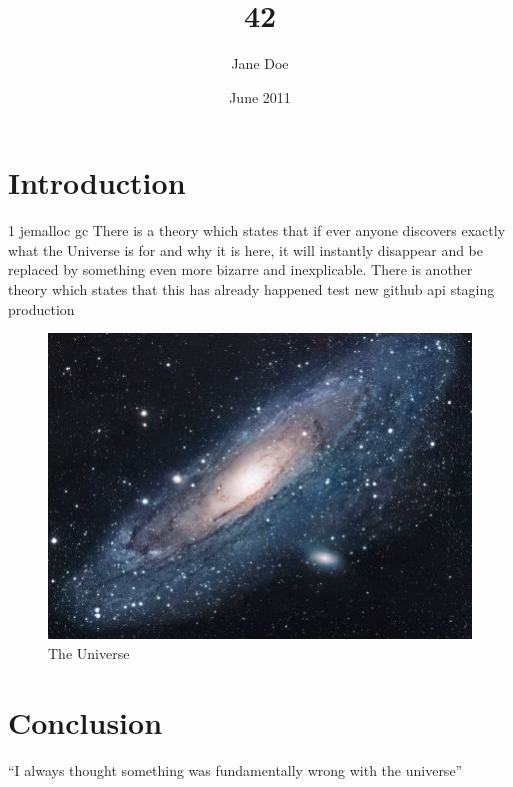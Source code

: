 \documentclass{article}
\title{42}
\author{Jane Doe}
\date{June 2011}
\begin{document}
\maketitle

\section{Introduction}
1
jemalloc gc
There is a theory which states that if ever anyone discovers exactly what
 the Universe is for and why it is here, 
it will instantly disappear and be replaced by something even more bizarre 
and inexplicable.
There is another theory which states that this has already happened
test new github api
staging production
\begin{figure}[h!]
\centering
\includegraphics[scale=1.7]{universe.jpg}
\caption{The Universe}
\label{threadsVsSync}
\end{figure}

\section{Conclusion}
``I always thought something was fundamentally wrong with the universe'' \citep{adams1995hitchhiker}



\end{document}
